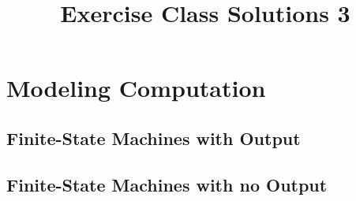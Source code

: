 \documentclass[11pt,a4paper]{article}
\newcommand{\chapter}[2]{%
\setcounter{section}{#1-1}%
\section{#2}%
}
\newcommand{\subchapter}[2]{%
\setcounter{subsection}{#1-1}%
\subsection{#2}%
}
\begin{document}
\title{Exercise Class Solutions 3}
\date{}
\author{}
\maketitle

\chapter{13}{Modeling Computation}
	\subchapter{2}{Finite-State Machines with Output}
		
		\pagebreak
	\subchapter{3}{Finite-State Machines with no Output}
		
		\pagebreak
		
		\pagebreak
		
		\pagebreak
		
		\pagebreak
		
		\pagebreak
		
		\pagebreak
		
		\pagebreak
		
		\pagebreak
		
		\pagebreak
		
		\pagebreak
		
		\pagebreak
		
		\pagebreak
		
		\pagebreak
		
		\pagebreak
\end{document}
